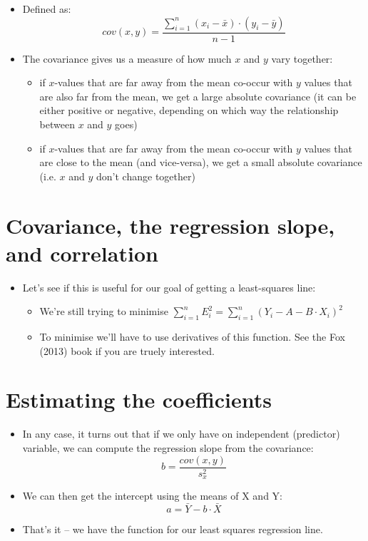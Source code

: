 \documentclass[]{article}
\providecommand{\tightlist}{%
  \setlength{\itemsep}{0pt}\setlength{\parskip}{0pt}}
\begin{document}
\begin{itemize}
\tightlist
\item
  Defined as:
  \[cov(x, y) = \frac{\sum\limits_{i = 1}^n {(x_i - \bar{x})\cdot(y_i - \bar{y})}}{n-1}\]
\item
  The covariance gives us a measure of how much \(x\) and \(y\) vary
  together:

  \begin{itemize}
  \tightlist
  \item
    if \(x\)-values that are far away from the mean co-occur with \(y\)
    values that are also far from the mean, we get a large absolute
    covariance (it can be either positive or negative, depending on
    which way the relationship between \(x\) and \(y\) goes)
  \item
    if \(x\)-values that are far away from the mean co-occur with \(y\)
    values that are close to the mean (and vice-versa), we get a small
    absolute covariance (i.e. \(x\) and \(y\) don't change together)
  \end{itemize}
\end{itemize}

\section{Covariance, the regression slope, and
correlation}\label{covariance-the-regression-slope-and-correlation}

\begin{itemize}
\tightlist
\item
  Let's see if this is useful for our goal of getting a least-squares
  line:

  \begin{itemize}
  \tightlist
  \item
    We're still trying to minimise
    \(\sum\limits_{i=1}^{n} E_i^2 = \sum\limits_{i=1}^{n}(Y_i - A - B \cdot X_i )^2\)
  \item
    To minimise we'll have to use derivatives of this function. See the
    Fox (2013) book if you are truely interested.
  \end{itemize}
\end{itemize}

\section{Estimating the coefficients}\label{estimating-the-coefficients}

\begin{itemize}
\tightlist
\item
  In any case, it turns out that if we only have on independent
  (predictor) variable, we can compute the regression slope from the
  covariance: \[b = \frac{cov(x, y)}{s_x^2}\]
\item
  We can then get the intercept using the means of X and Y:
  \[a = \bar{Y} - b\cdot\bar{X}\]
\item
  That's it -- we have the function for our least squares regression
  line.
\end{itemize}
\end{document}
